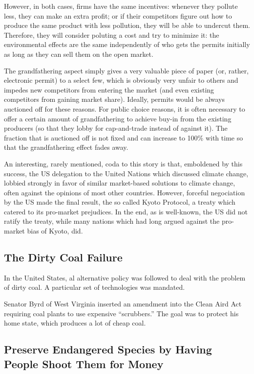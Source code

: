 However, in both cases, firms have the same incentives: whenever they pollute
less, they can make an extra profit; or if their competitors figure out how to
produce the same product with less pollution, they will be able to undercut
them. Therefore, they will consider poluting a cost and try to minimize it: the
environmental effects are the same independently of who gets the permits
initially as long as they can sell them on the open market.

The grandfathering aspect simply gives a very valuable piece of paper (or,
rather, electronic permit) to a select few, which is obviously very unfair to
others and impedes new competitors from entering the market (and even existing
competitors from gaining market share). Ideally, permits would be always
auctioned off for these reasons. For public choice reasons, it is often
necessary to offer a certain amount of grandfathering to achieve buy-in from
the existing producers (so that they lobby for cap-and-trade instead of against
it). The fraction that is auctioned off is not fixed and can increase to 100\%
with time so that the grandfathering effect fades away.

An interesting, rarely mentioned, coda to this story is that, emboldened by
this success, the US delegation to the United Nations which discussed climate
change, lobbied strongly in favor of similar market-based solutions to climate
change, often against the opinions of most other countries. However, forceful
negociation by the US made the final result, the so called Kyoto Protocol, a
treaty which catered to its pro-market prejudices. In the end, as is
well-known, the US did not ratify the treaty, while many nations which had long
argued against the pro-market bias of Kyoto, did.

\subsection{The Dirty Coal Failure}

In the United States, al alternative policy was followed to deal with the
problem of dirty coal. A particular set of technologies was mandated.

Senator Byrd of West Virginia inserted an amendment into the Clean Aird Act
requiring coal plants to use expensive ``scrubbers.'' The goal was to protect
his home state, which produces a lot of cheap coal.

\subsection{Preserve Endangered Species by Having People Shoot Them for Money}

